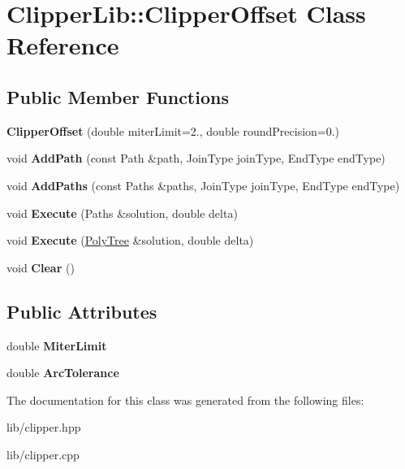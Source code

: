 \hypertarget{class_clipper_lib_1_1_clipper_offset}{}\section{Clipper\+Lib\+:\+:Clipper\+Offset Class Reference}
\label{class_clipper_lib_1_1_clipper_offset}
\subsection*{Public Member Functions}
\begin{DoxyCompactItemize}
\item 
\mbox{\label{class_clipper_lib_1_1_clipper_offset_a45b4750989901db0c3865c374abdfcdc}} 
{\bfseries Clipper\+Offset} (double miter\+Limit=2., double round\+Precision=0.)
\item 
\mbox{\label{class_clipper_lib_1_1_clipper_offset_a0cd68e3690072f510924a5b25291043b}} 
void {\bfseries Add\+Path} (const Path \&path, Join\+Type join\+Type, End\+Type end\+Type)
\item 
\mbox{\label{class_clipper_lib_1_1_clipper_offset_a18b35198f6370d76885af995ee2f16cb}} 
void {\bfseries Add\+Paths} (const Paths \&paths, Join\+Type join\+Type, End\+Type end\+Type)
\item 
\mbox{\label{class_clipper_lib_1_1_clipper_offset_ac591b25e483a52c99c3190a256ad4589}} 
void {\bfseries Execute} (Paths \&solution, double delta)
\item 
\mbox{\label{class_clipper_lib_1_1_clipper_offset_a3aaa9fcc20e503c967a23f1793536118}} 
void {\bfseries Execute} (\hyperlink{class_clipper_lib_1_1_poly_tree}{Poly\+Tree} \&solution, double delta)
\item 
\mbox{\label{class_clipper_lib_1_1_clipper_offset_ab444433587b6a3f6c89655938d889c7d}} 
void {\bfseries Clear} ()
\end{DoxyCompactItemize}
\subsection*{Public Attributes}
\begin{DoxyCompactItemize}
\item 
\mbox{\label{class_clipper_lib_1_1_clipper_offset_a36b3bf4571e5b831edd584cbcb179246}} 
double {\bfseries Miter\+Limit}
\item 
\mbox{\label{class_clipper_lib_1_1_clipper_offset_a6c1735720b06e6b92dc25891014b2a92}} 
double {\bfseries Arc\+Tolerance}
\end{DoxyCompactItemize}


The documentation for this class was generated from the following files\+:\begin{DoxyCompactItemize}
\item 
lib/clipper.\+hpp\item 
lib/clipper.\+cpp\end{DoxyCompactItemize}
